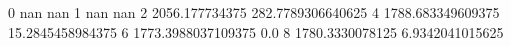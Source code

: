 0 nan nan
1 nan nan
2 2056.177734375 282.7789306640625
4 1788.683349609375 15.2845458984375
6 1773.3988037109375 0.0
8 1780.3330078125 6.9342041015625
